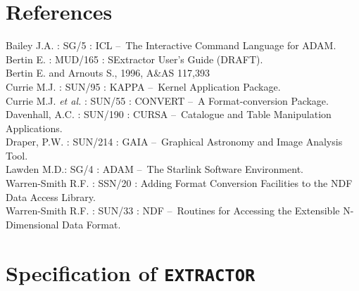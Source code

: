 \documentclass[twoside,11pt]{article}
\newcommand{\xref}[3]{#1}
\newcommand{\xlabel}[1]{}
\renewcommand{\_}{\texttt{\symbol{95}}}
\newcommand{\EXTRACTOR}{\texttt{EXTRACTOR}}
\newcommand{\dash}{--}
\newcommand{\dash}{-}
\begin{document}
\section{\xlabel{references}References}
Bailey J.A. : \xref{SG/5}{sg5}{} : ICL \dash\ The Interactive Command Language for ADAM.\\
Bertin E. : MUD/165 : SExtractor User's Guide (DRAFT).\\
Bertin E. and Arnouts S., 1996, A\&AS 117,393\\
Currie M.J. : \xref{SUN/95}{sun95}{} : KAPPA \dash\ Kernel Application Package.\\
Currie M.J. \textit{et al.} : \xref{SUN/55}{sun55}{} : CONVERT \dash\ A Format-conversion Package.\\
Davenhall, A.C. : \xref{SUN/190}{sun190}{} : CURSA \dash\ Catalogue and Table Manipulation Applications.\\
Draper, P.W. : \xref{SUN/214}{sun214}{} : GAIA \dash\ Graphical Astronomy and Image Analysis Tool.\\
Lawden M.D.: \xref{SG/4}{sg4}{} : ADAM \dash\ The Starlink Software Environment.\\
Warren-Smith R.F. : \xref{SSN/20}{ssn20}{} : Adding Format Conversion Facilities to the NDF Data Access Library.\\
Warren-Smith R.F. : \xref{SUN/33}{sun33}{} : NDF \dash\ Routines for Accessing the Extensible N-Dimensional Data Format.\\

\newpage
\appendix
\section{\xlabel{specification_of_extractor}Specification of \EXTRACTOR}
\end{document}
